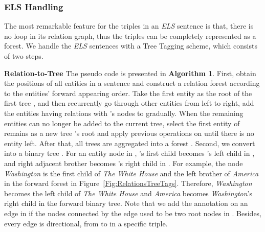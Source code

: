 \documentclass[conference]{IEEEtran}
\begin{document}
\subsubsection{ELS Handling}
\label{sssect:ELS}
The most remarkable feature for the triples in an \emph{ELS} sentence is that, there is no loop in its relation graph, thus the triples can be completely represented as a forest. We handle the \emph{ELS} sentences with a Tree Tagging scheme, which consists of two steps.

\textbf{Relation-to-Tree} The pseudo code is presented in \textbf{Algorithm 1}. First, obtain the positions of all entities in a sentence and construct a relation forest according to the entities' forward appearing order. Take the first entity as the root of the first tree , and then recurrently go through other entities 
from left to right, add the entities having relations with 's nodes to  gradually. When the remaining entities can no longer be added to the current tree, select the first entity of remains as a new tree 's root and apply previous operations on  until there is no entity left. After that, all trees are aggregated into a forest . Second, we convert  into a binary tree . For an entity node  in , 's first child becomes 's left child in , and right adjacent brother becomes 's right child in . For example, the node \emph{Washington} is the first child of \emph{The White House} and the left brother of \emph{America} in the forward forest in Figure~\ref{Fig:RelationsTreeTags}. Therefore, \emph{Washington} becomes the left child of \emph{The White House} and \emph{America} becomes \emph{Washington}'s right child in the forward binary tree. Note that we add the annotation  on an edge in  if the nodes connected by the edge used to be two root nodes in . Besides, every edge is directional, from  to  in a specific triple.
\end{document}
